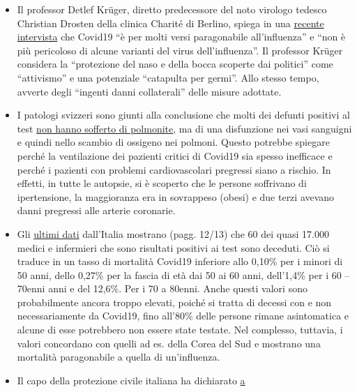 \begin{itemize}
\tightlist
\item
  Il professor Detlef Krüger, diretto predecessore del noto virologo
  tedesco Christian Drosten della clinica Charité di Berlino, spiega in
  una
  \href{https://de.sputniknews.com/interviews/20200425326953541-corona-gefahr-virologe/}{recente
  intervista} che Covid19 ``è per molti versi paragonabile
  all'influenza'' e ``non è più pericoloso di alcune varianti del virus
  dell'influenza''. Il professor Krüger considera la ``protezione del
  naso e della bocca scoperte dai politici'' come ``attivismo'' e una
  potenziale ``catapulta per germi''. Allo stesso tempo, avverte degli
  ``ingenti danni collaterali'' delle misure adottate.
\item
  I patologi svizzeri sono giunti alla conclusione che molti dei defunti
  positivi al test
  \href{https://www.welt.de/wissenschaft/article207417811/Corona-Tote-In-den-wenigsten-Faellen-eine-Lungenentzuendung.html}{non
  hanno sofferto di polmonite}, ma di una disfunzione nei vasi sanguigni
  e quindi nello scambio di ossigeno nei polmoni. Questo potrebbe
  spiegare perché la ventilazione dei pazienti critici di Covid19 sia
  spesso inefficace e perché i pazienti con problemi cardiovascolari
  pregressi siano a rischio. In effetti, in tutte le autopsie, si è
  scoperto che le persone soffrivano di ipertensione, la maggioranza era
  in sovrappeso (obesi) e due terzi avevano danni pregressi alle arterie
  coronarie.
\item
  Gli
  \href{https://www.epicentro.iss.it/coronavirus/bollettino/Bollettino-sorveglianza-integrata-COVID-19_16-aprile-2020.pdf\#page=13}{ultimi
  dati} dall'Italia mostrano (pagg. 12/13) che 60 dei quasi 17.000
  medici e infermieri che sono risultati positivi ai test sono deceduti.
  Ciò si traduce in un tasso di mortalità Covid19 inferiore allo 0,10\%
  per i minori di 50 anni, dello 0,27\% per la fascia di età dai 50 ai
  60 anni, dell'1,4\% per i 60 -- 70enni anni e del 12,6\%. Per i 70 a
  80enni. Anche questi valori sono probabilmente ancora troppo elevati,
  poiché si tratta di decessi con e non necessariamente da Covid19, fino
  all'80\% delle persone rimane asintomatica e alcune di esse potrebbero
  non essere state testate. Nel complesso, tuttavia, i valori concordano
  con quelli ad es. della Corea del Sud e mostrano una mortalità
  paragonabile a quella di un'influenza.
\item
  Il capo della protezione civile italiana ha dichiarato
  \href{https://www.theguardian.com/world/2020/apr/16/italian-police-broaden-care-home-coronavirus-milan}{a
}
\end{itemize}
